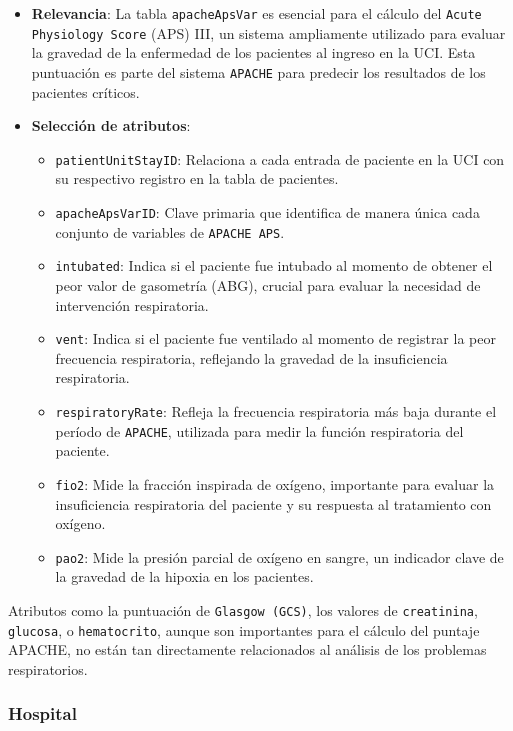 \documentclass[12pt, a4paper, twoside]{article}
\begin{document}
	\begin{itemize}
		\item \textbf{Relevancia}: La tabla \texttt{apacheApsVar} es esencial para el cálculo del \texttt{Acute Physiology Score} (APS) III, un sistema ampliamente utilizado para evaluar la gravedad de la enfermedad de los pacientes al ingreso en la UCI. Esta puntuación es parte del sistema \texttt{APACHE} para predecir los resultados de los pacientes críticos.
		
		\item \textbf{Selección de atributos}:
		\begin{itemize}
			\item \texttt{patientUnitStayID}: Relaciona a cada entrada de paciente en la UCI con su respectivo registro en la tabla de pacientes.
			\item \texttt{apacheApsVarID}: Clave primaria que identifica de manera única cada conjunto de variables de \texttt{APACHE APS}.
			\item \texttt{intubated}: Indica si el paciente fue intubado al momento de obtener el peor valor de gasometría (ABG), crucial para evaluar la necesidad de intervención respiratoria.
			\item \texttt{vent}: Indica si el paciente fue ventilado al momento de registrar la peor frecuencia respiratoria, reflejando la gravedad de la insuficiencia respiratoria.
			\item \texttt{respiratoryRate}: Refleja la frecuencia respiratoria más baja durante el período de \texttt{APACHE}, utilizada para medir la función respiratoria del paciente.
			\item \texttt{fio2}: Mide la fracción inspirada de oxígeno, importante para evaluar la insuficiencia respiratoria del paciente y su respuesta al tratamiento con oxígeno.
			\item \texttt{pao2}: Mide la presión parcial de oxígeno en sangre, un indicador clave de la gravedad de la hipoxia en los pacientes.
		\end{itemize}
		
	\end{itemize}
	
	Atributos como la puntuación de \texttt{Glasgow (GCS)}, los valores de \texttt{creatinina}, \texttt{glucosa}, o \texttt{hematocrito}, aunque son importantes para el cálculo del puntaje APACHE, no están tan directamente relacionados al análisis de los problemas respiratorios.  \cite{eICU2024}
	
	
	\subsubsection{Hospital}
	
\end{document}
